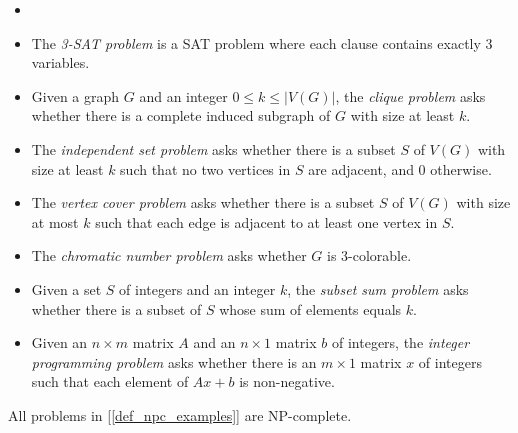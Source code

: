     \begin{defn} \label{def_npc_examples} \begin{itemize}
        \item[]
        \item The \emph{3-SAT problem} is a SAT problem where each clause contains exactly 3 variables.
        \item Given a graph $G$ and an integer $0 \leq k \leq |V(G)|$, the \emph{clique problem} asks whether there is a complete induced subgraph of $G$ with size at least $k$.
        \item The \emph{independent set problem} asks whether there is a subset $S$ of $V(G)$ with size at least $k$ such that no two vertices in $S$ are adjacent, and 0 otherwise.
        \item The \emph{vertex cover problem} asks whether there is a subset $S$ of $V(G)$ with size at most $k$ such that each edge is adjacent to at least one vertex in $S$.
        \item The \emph{chromatic number problem} asks whether $G$ is 3-colorable.
        \item Given a set $S$ of integers and an integer $k$, the \emph{subset sum problem} asks whether there is a subset of $S$ whose sum of elements equals $k$.
        \item Given an $n \times m$ matrix $A$ and an $n \times 1$ matrix $b$ of integers, the \emph{integer programming problem} asks whether there is an $m \times 1$ matrix $x$ of integers such that each element of $Ax+b$ is non-negative.
    \end{itemize} \end{defn}
        
    \begin{thm} \label{thm_npc_examples}
        All problems in [\ref{def_npc_examples}] are NP-complete.
    \end{thm}
        
